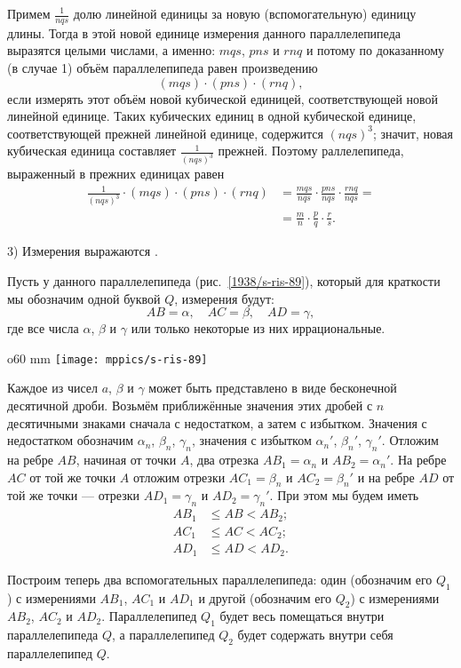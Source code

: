 Примем $\frac 1{nqs}$ долю линейной единицы за новую (вспомогательную) единицу длины.
Тогда в этой новой единице измерения данного параллелепипеда выразятся целыми числами, а именно: $mqs$, $pns$ и $rnq$
и потому по доказанному (в случае 1) объём параллелепипеда равен произведению
\[(mqs)\cdot (pns)\cdot (rnq),\]
 если измерять этот объём новой кубической единицей, соответствующей новой линейной единице.
Таких кубических единиц в одной кубической единице, соответствующей прежней линейной единице, содержится $(nqs)^3$; значит, новая кубическая единица составляет $\tfrac1{(nqs)^3}$ прежней.
Поэтому раллелепипеда, выраженный в прежних единицах равен
\begin{align*}\frac1{(nqs)^3}\cdot(mqs)\cdot (pns)\cdot (rnq)&=\frac{mqs}{nqs}\cdot \frac{pns}{nqs}\cdot \frac{rnq}{nqs}= 
\\&=\frac mn\cdot \frac pq\cdot \frac rs.
\end{align*}


3) Измерения выражаются .

Пусть у данного параллелепипеда (рис.~\ref{1938/s-ris-89}), который для краткости мы обозначим одной буквой $Q$, измерения будут:
\[AB=\alpha,\quad AC=\beta,\quad AD=\gamma,\]
где все числа $\alpha$, $\beta$ и $\gamma$ или только некоторые из них иррациональные.

\begin{wrapfigure}{o}{60 mm}
\vskip-0mm
\centering
\texttt{[image: mppics/s-ris-89]}
\caption{}\label{1938/s-ris-89}
\vskip-0mm
\end{wrapfigure}

Каждое из чисел $a$, $\beta$ и $\gamma$ может быть представлено в виде бесконечной десятичной дроби.
Возьмём приближённые значения этих дробей с $n$ десятичными знаками сначала с недостатком, а затем с избытком.
Значения с недостатком обозначим $\alpha_n$, $\beta_n$, $\gamma_n$, значения с избытком $\alpha_n'$, $\beta_n'$, $\gamma_n'$.
Отложим на ребре $AB$, начиная от точки $A$, два отрезка $AB_1 = \alpha_n$ и $AB_2=\alpha_n'$.
На ребре $AC$ от той же точки $A$ отложим отрезки $AC_1=\beta_n$ и $AC_2=\beta_n'$ и на ребре $AD$ от той же точки — отрезки $AD_1=\gamma_n$ и $AD_2=\gamma_n'$.
При этом мы будем иметь
\begin{align*}
AB_1&\le AB<AB_2;
\\
AC_1&\le AC<AC_2;
\\ 
AD_1&\le AD<AD_2.
\end{align*}

Построим теперь два вспомогательных параллелепипеда: один (обозначим его $Q_1$) с измерениями $AB_1$, $AC_1$ и $AD_1$ и другой (обозначим его $Q_2$) с измерениями $AB_2$, $AC_2$ и $AD_2$.
Параллелепипед $Q_1$ будет весь помещаться внутри параллелепипеда $Q$, а параллелепипед $Q_2$ будет содержать внутри себя параллелепипед $Q$.

